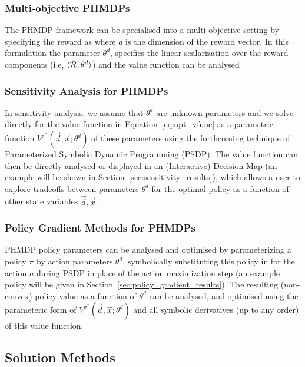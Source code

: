 \subsubsection{Multi-objective PHMDPs}

The PHMDP framework can be specialised into a multi-objective setting
by specifying the reward as {\footnotesize \MORewardFunc} where
{\footnotesize $ d $} is the dimension of the reward vector. In this
formulation the parameter {\footnotesize $ \theta^{d} $}, specifies
the linear scalarization over the reward components (i.e, $\langle
\mathcal{R}, \theta^{d} \rangle$) and the value function can be analysed


\subsubsection{Sensitivity Analysis for PHMDPs}

In sensitivity analysis, we assume that $\theta^{d}$ are unknown
parameters and we solve directly for the value function in
Equation~\eqref{eq:opt_vfunc} as a parametric function
$V^{\pi^{*}}(\vec{d}, \vec{x}; \theta^{d})$ of these parameters using
the forthcoming technique of Parameterized Symbolic Dynamic
Programming (PSDP).  The value function can then be directly analysed
or displayed in an (Interactive) Decision Map (an example will be
shown in Section~\ref{sec:sensitivity_results}), which allows a user
to explore tradeoffs between parameters $\theta^{d}$ for the optimal
policy as a function of other state variables $\vec{d},\vec{x}$.

\subsubsection{Policy Gradient Methods for PHMDPs}

PHMDP policy parameters can be analysed and optimised by
parameterizing a policy $\pi$ by action parameters $\theta^{d}$,
symbolically substituting this policy in for the action $a$ during
PSDP in place of the action maximization step (an example policy will
be given in Section~\ref{sec:policy_gradient_results}).  The resulting
(non-convex) policy value as a function of $\theta^{d}$ can be
analysed, and optimised using the parameteric form of
$V^{\pi^{*}}(\vec{d}, \vec{x}; \theta^{d})$ and all symbolic
derivatives (up to any order) of this value function.

\subsection{Solution Methods}

